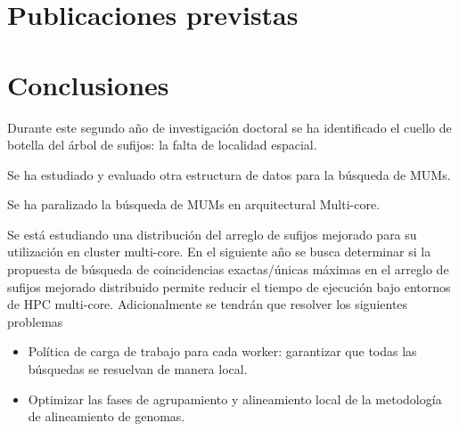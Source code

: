 \documentclass[12pt,a4paper]{article}
\begin{document}
\section{Publicaciones previstas}
\section{Conclusiones}
\indent
Durante este segundo año de investigación doctoral se ha identificado el cuello de botella del árbol de sufijos: la falta de localidad espacial.

Se ha estudiado y evaluado otra estructura de datos para la búsqueda de MUMs.

Se ha paralizado la búsqueda de MUMs en arquitectural Multi-core.

Se está estudiando una distribución del arreglo de sufijos mejorado para su utilización en cluster multi-core.
En el siguiente año se busca determinar si la propuesta de búsqueda de coincidencias exactas/únicas máximas en el arreglo de sufijos mejorado distribuido permite reducir el tiempo de ejecución bajo entornos de HPC multi-core. Adicionalmente se tendrán que resolver los siguientes problemas
\begin{itemize}
  \item Política de carga de trabajo para cada worker: garantizar que todas las búsquedas se resuelvan de manera local.
  \item Optimizar las fases de agrupamiento y alineamiento local de la metodología de alineamiento de genomas.
\end{itemize}
 
	
\end{document}
